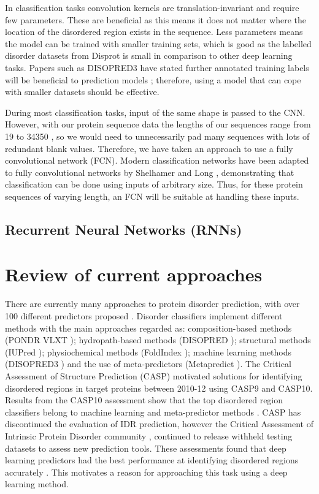 \documentclass{l4proj}
\begin{document}
In classification tasks convolution kernels are translation-invariant and require few parameters. These are beneficial as this means it does not matter where the location of the disordered region exists in the sequence. Less parameters means the model can be trained with smaller training sets, which is good as the labelled disorder datasets from Disprot \citep{disprot} is small in comparison to other deep learning tasks. Papers such as DISOPRED3 have stated further annotated training labels will be beneficial to prediction models \citep{disopred3_paper}; therefore, using a model that can cope with smaller datasets should be effective.

During most classification tasks, input of the same shape is passed to the CNN. However, with our protein sequence data the lengths of our sequences range from 19 \citep{prot_P0C8E0} to 34350 \citep{prot_Q8WZ42}, so we would need to unnecessarily pad many sequences with lots of redundant blank values. Therefore, we have taken an approach to use a fully convolutional network (FCN). Modern classification networks have been adapted to fully convolutional networks by Shelhamer and Long \citep{fcn_seg}, demonstrating that classification can be done using inputs of arbitrary size. Thus, for these protein sequences of varying length, an FCN will be suitable at handling these inputs. 

\subsection{Recurrent Neural Networks (RNNs)}

\section{Review of current approaches}
\label{sec:current approaches}

There are currently many approaches to protein disorder prediction, with over 100 different predictors proposed \citep{Zhao:22}. Disorder classifiers implement different methods with the main approaches regarded as: composition-based methods (PONDR VLXT \citep{Romero:01}); hydropath-based methods (DISOPRED \citep{Ward:04}); structural methods (IUPred \citep{Dosztanyi:18}); physiochemical methods (FoldIndex \citep{Prilusky:05}); machine learning methods (DISOPRED3 \citep{disopred3_paper}) and the use of meta-predictors (Metapredict \citep{Emenecker:21}). The Critical Assessment of Structure Prediction (CASP) \citep{casp} motivated solutions for identifying disordered regions in target proteins between 2010-12 using CASP9 and CASP10. Results from the CASP10 assessment \citep{CASP10} show that the top disordered region classifiers belong to machine learning and meta-predictor methods \citep{Zhao:22}. CASP has discontinued the evaluation of IDR prediction, however the Critical Assessment of Intrinsic Protein Disorder community \citep{Necci:21}, continued to release withheld testing datasets to assess new prediction tools. These assessments found that deep learning predictors had the best performance at identifying disordered regions accurately \citep{Zhao:22}. This motivates a reason for approaching this task using a deep learning method.
\end{document}
